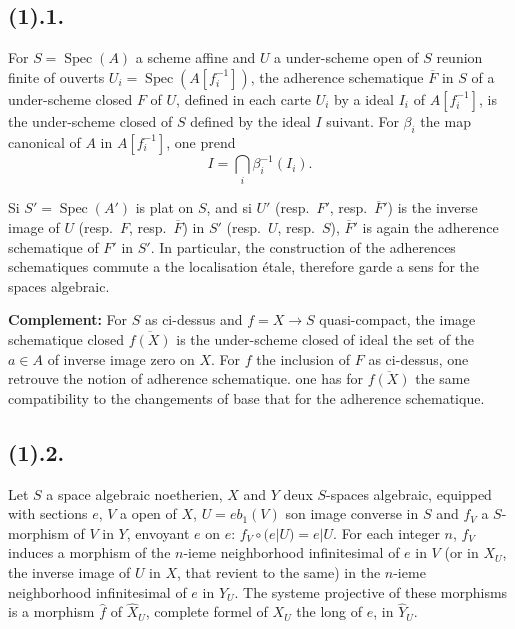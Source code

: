 \documentclass[12pt,a4paper]{article}
\theoremstyle{plain}
\theoremstyle{definition}
\theoremstyle{remark}
\DeclareMathOperator{\Spec}{Spec}
\begin{document}
\subsection*{\textbf{(1).1.}}
For $S = \Spec(A)$ a scheme affine and $U$ a under-scheme open of $S$ reunion finite of ouverts $U_i = \Spec(A[f_i^{-1}])$, the adherence schematique $\overline{F}$ in $S$ of a under-scheme closed $F$ of $U$, defined in each carte $U_i$ by a ideal $I_i$ of $A[f_i^{-1}]$, is the under-scheme closed of $S$ defined by the ideal $I$ suivant. For $\beta_i$ the map canonical of $A$ in $A[f_i^{-1}]$, one prend
\[
I = \bigcap_i \beta_i^{-1}(I_i).
\]

Si $S' = \Spec(A')$ is plat on $S$, and si $U'$ (resp.~$F'$, resp.~$\overline{F}'$) is the inverse image of $U$ (resp.~$F$, resp.~$\overline{F}$) in $S'$ (resp.~$U$, resp.~$S$), $\overline{F}'$ is again the adherence schematique of $F'$ in $S'$. In particular, the construction of the adherences schematiques commute a the localisation étale, therefore garde a sens for the spaces algebraic.

\textbf{Complement:} For $S$ as ci-dessus and $f = X \to S$ quasi-compact, the image schematique closed $\overline{f(X)}$ is the under-scheme closed of ideal the set of the $a \in A$ of inverse image zero on $X$. For $f$ the inclusion of $F$ as ci-dessus, one retrouve the notion of adherence schematique. one has for $\overline{f(X)}$ the same compatibility to the changements of base that for the adherence schematique.

\subsection*{\textbf{(1).2.}}
Let $S$ a space algebraic noetherien, $X$ and $Y$ deux $S$-spaces algebraic, equipped with sections $e$, $V$ a open of $X$, $U = eb_1(V)$ son image converse in $S$ and $f_V$ a $S$-morphism of $V$ in $Y$, envoyant $e$ on $e$: $f_V \circ (e|U) = e|U$. For each integer $n$, $f_V$ induces a morphism of the $n$-ieme neighborhood infinitesimal of $e$ in $V$ (or in $X_U$, the inverse image of $U$ in $X$, that revient to the same) in the $n$-ieme neighborhood infinitesimal of $e$ in $Y_U$. The systeme projective of these morphisms is a morphism $\hat{f}$ of $\hat{X}_U$, complete formel of $X_U$ the long of $e$, in $\hat{Y}_U$.
\end{document}
